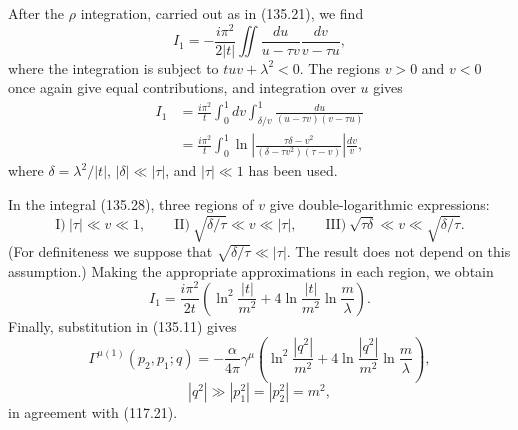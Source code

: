After the $\rho$ integration, carried out as in (135.21), we find
\[
I_1=-\frac{i\pi^2}{2|t|}\iint\frac{du}{u-\tau v}\frac{dv}{v-\tau u},
\]
where the integration is subject to $tuv+\lambda^2<0$. The regions $v>0$ and $v<0$ once again give equal contributions, and integration over $u$ gives
\begin{equation}
\begin{aligned}
I_1&=\frac{i\pi^2}{t}\int_0^1dv\int_{\delta/v}^1
\frac{du}{(u-\tau v)(v-\tau u)}\\
&=\frac{i\pi^2}{t}\int_0^1
\ln\left|\frac{\tau\delta-v^2}{(\delta-\tau v^2)(\tau-v)}\right|\frac{dv}{v},
\end{aligned}
\tag{135.28}
\end{equation}
where $\delta=\lambda^2/|t|$, $|\delta|\ll|\tau|$, and $|\tau|\ll1$ has been used.

In the integral (135.28), three regions of $v$ give double-logarithmic expressions:
\[
\mathrm{I})\ |\tau|\ll v\ll1,\qquad
\mathrm{II})\ \sqrt{\delta/\tau}\ll v\ll|\tau|,\qquad
\mathrm{III})\ \sqrt{\tau\delta}\ll v\ll\sqrt{\delta/\tau}.
\]
(For definiteness we suppose that $\sqrt{\delta/\tau}\ll|\tau|$. The result does not depend on this assumption.) Making the appropriate approximations in each region, we obtain
\begin{equation}
I_1=\frac{i\pi^2}{2t}\left(\ln^2\frac{|t|}{m^2}+4\ln\frac{|t|}{m^2}\ln\frac{m}{\lambda}\right).
\tag{135.29}
\end{equation}
Finally, substitution in (135.11) gives
\begin{equation}
\Gamma^{\mu(1)}(p_2,p_1;q)=-\frac{\alpha}{4\pi}\gamma^\mu
\left(\ln^2\frac{|q^2|}{m^2}+4\ln\frac{|q^2|}{m^2}\ln\frac{m}{\lambda}\right),
\tag{135.30}
\end{equation}
\[
|q^2|\gg|p_1^2|=|p_2^2|=m^2,
\]
in agreement with (117.21).
